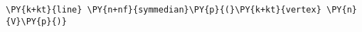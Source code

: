 \begin{Verbatim}[commandchars=\\\{\}]
    \PY{k+kt}{line} \PY{n+nf}{symmedian}\PY{p}{(}\PY{k+kt}{vertex} \PY{n}{V}\PY{p}{)}
\end{Verbatim}
